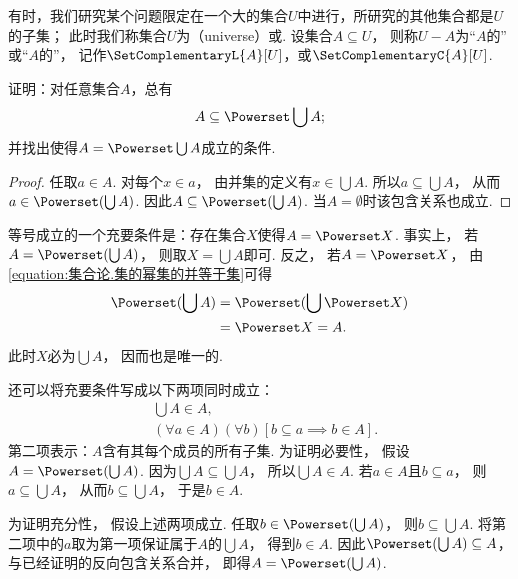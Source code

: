 有时，我们研究某个问题限定在一个大的集合\(U\)中进行，所研究的其他集合都是\(U\)的子集；
此时我们称集合\(U\)为（universe）或.
设集合\(A \subseteq U\)，
则称\(U-A\)为“\(A\)的”
或“\(A\)的”，
记作\(\SetComplementaryL{A}[U]\)，或\(\SetComplementaryC{A}[U]\).

\begin{example}
证明：对任意集合\(A\)，总有
\begin{equation}\label{equation:集合论.系的并的幂集包含系}
	A \subseteq \Powerset \bigcup A;
\end{equation}
并找出使得\(A = \Powerset \bigcup A\)成立的条件.
    \begin{proof}
        任取\(a\in A\).
        对每个\(x\in a\)，
        由并集的定义有\(x\in\bigcup A\).
        所以\(a\subseteq\bigcup A\)，
        从而\(a\in\Powerset(\bigcup A)\).
        因此\(A\subseteq\Powerset(\bigcup A)\).
        当\(A=\emptyset\)时该包含关系也成立.
    \end{proof}
    \begin{solution}
        等号成立的一个充要条件是：存在集合\(X\)使得\(A=\Powerset X\).
        事实上，
        若\(A=\Powerset(\bigcup A)\)，
        则取\(X=\bigcup A\)即可.
        反之，
        若\(A=\Powerset X\)，
        由\cref{equation:集合论.集的幂集的并等于集}可得
        \begin{align*}
            \Powerset(\bigcup A)
            &= \Powerset(\bigcup\Powerset X) \\
            &= \Powerset X=A.
        \end{align*}
        此时\(X\)必为\(\bigcup A\)，
        因而也是唯一的.

        还可以将充要条件写成以下两项同时成立：
        \begin{align*}
            &\bigcup A\in A, \\
            &(\forall a\in A)(\forall b)[b\subseteq a\implies b\in A].
        \end{align*}
        第二项表示：\(A\)含有其每个成员的所有子集.
        为证明必要性，
        假设\(A=\Powerset(\bigcup A)\).
        因为\(\bigcup A\subseteq\bigcup A\)，
        所以\(\bigcup A\in A\).
        若\(a\in A\)且\(b\subseteq a\)，
        则\(a\subseteq\bigcup A\)，
        从而\(b\subseteq\bigcup A\)，
        于是\(b\in A\).

        为证明充分性，
        假设上述两项成立.
        任取\(b\in\Powerset(\bigcup A)\)，
        则\(b\subseteq\bigcup A\).
        将第二项中的\(a\)取为第一项保证属于\(A\)的\(\bigcup A\)，
        得到\(b\in A\).
        因此\(\Powerset(\bigcup A)\subseteq A\)，
        与已经证明的反向包含关系合并，
        即得\(A=\Powerset(\bigcup A)\).


\end{solution}
\end{example}
